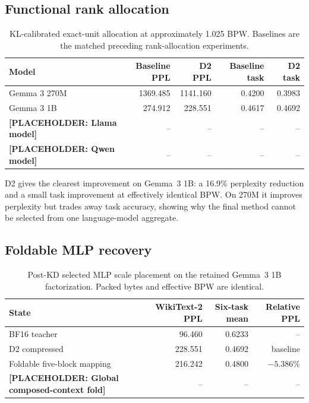 \documentclass[10pt]{article}
\newcommand{\placeholder}[1]{\textcolor{red!70!black}{\textbf{[PLACEHOLDER: #1]}}}
\begin{document}
\subsection{Functional rank allocation}

\begin{table}[t]
\centering
\caption{KL-calibrated exact-unit allocation at approximately 1.025 BPW.
Baselines are the matched preceding rank-allocation experiments.}
\label{tab:d2}
\begin{tabular}{lrrrr}
\toprule
Model & Baseline PPL & D2 PPL & Baseline task & D2 task \\
\midrule
Gemma 3 270M & 1369.485 & 1141.160 & 0.4200 & 0.3983 \\
Gemma 3 1B   & 274.912  & 228.551  & 0.4617 & 0.4692 \\
\placeholder{Llama model} & -- & -- & -- & -- \\
\placeholder{Qwen model}  & -- & -- & -- & -- \\
\bottomrule
\end{tabular}
\end{table}

D2 gives the clearest improvement on Gemma~3 1B: a 16.9\% perplexity reduction
and a small task improvement at effectively identical BPW. On 270M it improves
perplexity but trades away task accuracy, showing why the final method cannot
be selected from one language-model aggregate.

\subsection{Foldable MLP recovery}

\begin{table}[t]
\centering
\caption{Post-KD selected MLP scale placement on the retained Gemma~3 1B
factorization. Packed bytes and effective BPW are identical.}
\label{tab:fold}
\begin{tabular}{lrrr}
\toprule
State & WikiText-2 PPL & Six-task mean & Relative PPL \\
\midrule
BF16 teacher & 96.460 & 0.6233 & -- \\
D2 compressed & 228.551 & 0.4692 & baseline \\
Foldable five-block mapping & 216.242 & 0.4800 & $-5.386\%$ \\
\placeholder{Global composed-context fold} & -- & -- & -- \\
\bottomrule
\end{tabular}
\end{table}
\end{document}
